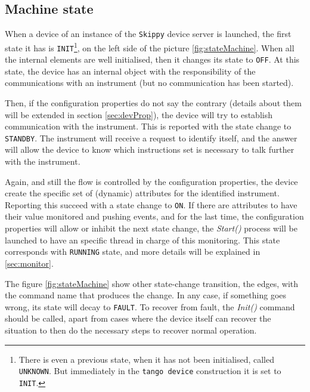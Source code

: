 \documentclass[a4paper,10pt]{article}
\begin{document}
\subsection{Machine state}

When a device of an instance of the \texttt{Skippy} device server is launched, the first state it has is \texttt{INIT}\footnote{There is even a previous state, when it has not been initialised, called \texttt{UNKNOWN}. But immediately in the \texttt{tango device} construction it is set to \texttt{INIT}.}, on the left side of the picture \ref{fig:stateMachine}. When all the internal elements are well initialised, then it changes its state to \texttt{OFF}. At this state, the device has an internal object with the responsibility of the communications with an instrument (but no communication has been started).

Then, if the configuration properties do not say the contrary (details about them will be extended in section \ref{sec:devProp}), the device will try to establish communication with the instrument. This is reported with the state change to \texttt{STANDBY}. The instrument will receive a request to identify itself, and the answer will allow the device to know which instructions set is necessary to talk further with the instrument.

Again, and still the flow is controlled by the configuration properties, the device create the specific set of (dynamic) attributes for the identified instrument. Reporting this succeed with a state change to \texttt{ON}. If there are attributes to have their value monitored and pushing events, and for the last time, the configuration properties will allow or inhibit the next state change, the \emph{Start()} process will be launched to have an specific thread in charge of this monitoring. This state corresponds with \texttt{RUNNING} state, and more details will be explained in \ref{sec:monitor}.

The figure \ref{fig:stateMachine} show other state-change transition, the edges, with the command name that produces the change. In any case, if something goes wrong, its state will decay to \texttt{FAULT}. To recover from fault, the \emph{Init()} command should be called, apart from cases where the device itself can recover the situation to then do the necessary steps to recover normal operation.

\begin{figure}[h]
\end{figure}
\end{document}
